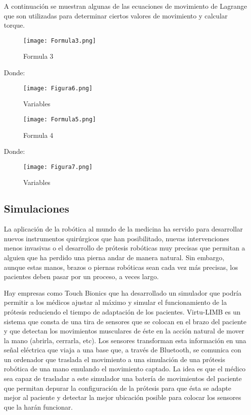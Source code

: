 \documentclass{article}
\begin{document}
A continuación se muestran algunas de las ecuaciones de movimiento de Lagrange que son utilizadas para determinar ciertos valores de movimiento y calcular torque.

\begin{figure} [h!]%
    \centering
    \texttt{[image: Formula3.png]} %
    \caption{Formula 3}
    \label{grafica}
\end{figure}
\newpage
Donde:
\begin{figure} [h!]%
    \centering
    \texttt{[image: Figura6.png]} %
    \caption{Variables}
    \label{grafica}
\end{figure}

\begin{figure} [h!]%
    \centering
    \texttt{[image: Formula5.png]} %
    \caption{Formula 4}
    \label{grafica}
\end{figure}


Donde: 

\begin{figure} [h!]%
    \centering
    \texttt{[image: Figura7.png]} %
    \caption{Variables}
    \label{grafica}
\end{figure}

\subsection{Simulaciones}

La aplicación de la robótica al mundo de la medicina ha servido para desarrollar nuevos instrumentos quirúrgicos que han posibilitado,  nuevas intervenciones menos invasivas o el desarrollo de prótesis robóticas muy precisas que permitan a alguien que ha perdido una pierna andar de manera natural. Sin embargo, aunque estas manos, brazos o piernas robóticas sean cada vez más precisas, los pacientes deben pasar por un proceso, a veces largo. 

Hay empresas como Touch Bionics que ha desarrollado un simulador que podría permitir a los médicos ajustar al máximo y simular el funcionamiento de la prótesis reduciendo el tiempo de adaptación de los pacientes. Virtu-LIMB es un sistema que consta de una tira de sensores que se colocan en el brazo del paciente y que detectan los movimientos musculares de éste en la acción natural de mover la mano (abrirla, cerrarla, etc). Los sensores transforman esta información en una señal eléctrica que viaja a una base que, a través de Bluetooth, se comunica con un ordenador que traslada el movimiento a una simulación de una prótesis robótica de una mano emulando el movimiento captado. La idea es que el médico sea capaz de trasladar a este simulador una batería de movimientos del paciente que permitan depurar la configuración de la prótesis para que ésta se adapte mejor al paciente y detectar la mejor ubicación posible para colocar los sensores que la harán funcionar\cite{7}.
\end{document}

